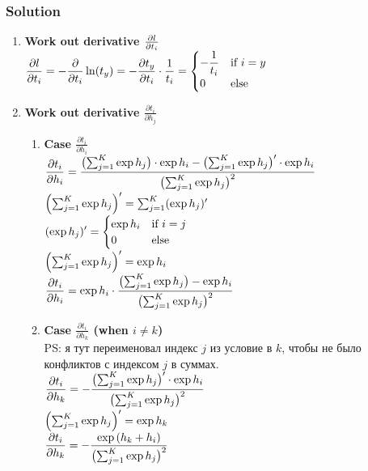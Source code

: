 \documentclass{article}
\newcommand{\block}[1]{\vspace{-1em}\begin{framed}#1\end{framed}\vspace{-\lastskip}\vspace{-.1cm}\hfill}
\begin{document}
\subsubsection*{Solution}
\block{
  \begin{enumerate}
    \item \textbf{Work out derivative $\frac{\partial l}{\partial t_i}$} \\
      $\displaystyle \frac{\partial l}{\partial t_i} = -\frac{\partial}{\partial t_i} \ln(t_y)
      = - \frac{\partial t_y}{\partial t_i} \cdot \frac{1}{t_i} = \begin{cases}
        -\dfrac{1}{t_i} & \text{if } i = y \\
        0 & \text{else}\\
      \end{cases}$

    \item \textbf{Work out derivative $\frac{\partial t_i}{\partial h_j}$}
    \begin{enumerate}[label=2.\arabic*.]
      \item \textbf{Case $\frac{\partial t_i}{\partial h_i}$} \\
        $\displaystyle \frac{\partial t_i}{\partial h_i} = \frac{ \bigl(\sum_{j=1}^K \exp{h_j}\bigr)  \cdot \exp{h_i} - \bigl(\sum_{j=1}^K \exp{h_j}\bigr)' \cdot \exp{h_i}}{\bigl(\sum_{j=1}^K \exp{h_j}\bigr)^2}$ \vspace{0.5em} \\
        $\left(\sum_{j=1}^K \exp{h_j}\right)' = \sum_{j=1}^K (\exp{h_j})'$ \vspace{0.5em} \\
        $\displaystyle (\exp{h_j})' = \begin{cases}
          \exp{h_i} & \text{if } i = j \\
          0 & \text{else}\\
        \end{cases}$ \vspace{0.5em} \\
        $\left(\sum_{j=1}^K \exp{h_j}\right)' = \exp{h_i}$ \vspace{0.5em} \\
        $\displaystyle \frac{\partial t_i}{\partial h_i} = \exp{h_i} \cdot \frac{ \bigl(\sum_{j=1}^K \exp{h_j}\bigr) - \exp{h_i}}{\bigl(\sum_{j=1}^K \exp{h_j}\bigr)^2}$

      \item \textbf{Case $\frac{\partial t_i}{\partial h_k}$ (when $i \neq k$)} \\
        PS: я тут переименовал индекс $j$ из условие в $k$, чтобы не было конфликтов с индексом $j$ в суммах. \vspace{0.5em} \\
        $\displaystyle \frac{\partial t_i}{\partial h_k} = -\frac{\bigl(\sum_{j=1}^K \exp{h_j}\bigr)' \cdot \exp{h_i}}{\bigl(\sum_{j=1}^K \exp{h_j}\bigr)^2}$ \vspace{0.5em} \\
        $\left(\sum_{j=1}^K \exp{h_j}\right)' = \exp{h_k}$ \vspace{0.5em} \\
        $\displaystyle \frac{\partial t_i}{\partial h_k} = -\frac{\exp{(h_k + h_i)}}{\bigl(\sum_{j=1}^K \exp{h_j}\bigr)^2}$
    \end{enumerate}


\end{enumerate}}
\end{document}
